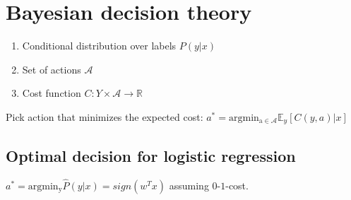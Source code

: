 \section*{Bayesian decision theory}
\begin{enumerate}[noitemsep,leftmargin=6mm,topsep=0pt,parsep=0pt,partopsep=0pt]
	\item Conditional distribution over labels $P(y|x)$
	\item Set of actions $\mathcal{A}$
	\item Cost function $C:Y\times \mathcal{A} \rightarrow \mathbb{R}$
\end{enumerate}

Pick action that minimizes the expected cost:
$a^* = \operatorname{argmin_{a \in \mathcal{A}}} \mathbb{E}_y[C(y,a)|x]$

\subsection*{Optimal decision for logistic regression}
$a^* = \operatorname{argmin_y} \hat{P}(y|x) = sign(w^T x)$ assuming 
$0$-$1$-cost.
\\